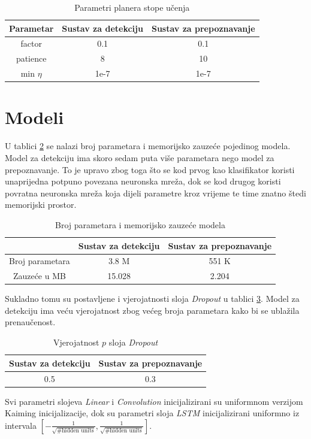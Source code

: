 \documentclass[times, utf8, diplomski]{fer}
\begin{document}
\begin{table}[H]
    \centering
    \begin{tabular}{|c|c|c|}
        \hline
        Parametar & Sustav za detekciju & Sustav za prepoznavanje \\
        \hline \hline
        factor & 0.1 & 0.1 \\
        \hline
        patience & 8 & 10 \\
        \hline
        min $\eta$ & 1e-7 & 1e-7 \\
        \hline
    \end{tabular}
    \caption{Parametri planera stope učenja}
    \label{tab:scheduler}
\end{table}

\section{Modeli}
U tablici \ref{tab:models} se nalazi broj parametara i memorijsko zauzeće pojedinog modela. Model za detekciju ima skoro sedam puta više parametara nego model za prepoznavanje. To je upravo zbog toga što se kod prvog kao klasifikator koristi unaprijedna potpuno povezana neuronska mreža, dok se kod drugog koristi povratna neuronska mreža koja dijeli parametre kroz vrijeme te time znatno štedi memorijski prostor.
\begin{table}[H]
    \centering
    \begin{tabular}{|c|c|c|}
        \hline
         & Sustav za detekciju & Sustav za prepoznavanje \\
        \hline \hline
        Broj parametara & 3.8 M & 551 K \\
        \hline
        Zauzeće u MB & 15.028 & 2.204 \\
        \hline
    \end{tabular}
    \caption{Broj parametara i memorijsko zauzeće modela}
    \label{tab:models}
\end{table}

Sukladno tomu su postavljene i vjerojatnosti sloja \textit{Dropout} u tablici \ref{tab:dropout}. Model za detekciju ima veću vjerojatnost zbog većeg broja parametara kako bi se ublažila prenaučenost.
\begin{table}[H]
    \centering
    \begin{tabular}{|c|c|}
        \hline
        Sustav za detekciju & Sustav za prepoznavanje \\
        \hline \hline
        0.5 & 0.3 \\
        \hline
    \end{tabular}
    \caption{Vjerojatnost $p$ sloja \textit{Dropout}}
    \label{tab:dropout}
\end{table}
Svi parametri slojeva \textit{Linear} i \textit{Convolution} inicijalizirani su uniformnom verzijom Kaiming inicijalizacije, dok su parametri sloja \textit{LSTM} inicijalizirani uniformno iz intervala $[-\frac{1}{\sqrt{\text{\#hidden units}}}, \frac{1}{\sqrt{\text{\#hidden units}}}]$.
\end{document}
